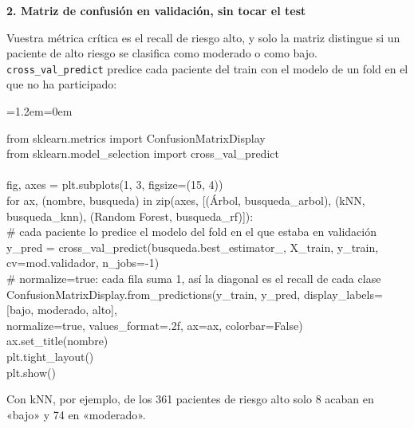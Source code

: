\documentclass[11pt,a4paper]{article}
\newenvironment{codigo}
  {\par\smallskip\begin{list}{}{\leftmargin=1.2em\rightmargin=0em}\item\relax\ttfamily\scriptsize\raggedright}
  {\end{list}\smallskip}
\begin{document}
{\smallskip\noindent\textbf{2. Matriz de confusión en validación, sin tocar el test}\par
Vuestra métrica crítica es el recall de riesgo alto, y solo la matriz distingue si un paciente de alto riesgo se clasifica como moderado o como bajo. \texttt{cross\_\allowbreak{}val\_\allowbreak{}predict} predice cada paciente del train con el modelo de un fold en el que no ha participado:

\begin{codigo}
from sklearn.metrics import ConfusionMatrixDisplay \\{}
from sklearn.model\_\allowbreak{}selection import cross\_\allowbreak{}val\_\allowbreak{}predict \\{}
\mbox{} \\{}
fig, axes = plt.subplots(1, 3, figsize=(15, 4)) \\{}
for ax, (nombre, busqueda) in zip(axes, [(\textquotedbl{}Árbol\textquotedbl{}, busqueda\_\allowbreak{}arbol), (\textquotedbl{}kNN\textquotedbl{}, busqueda\_\allowbreak{}knn), (\textquotedbl{}Random Forest\textquotedbl{}, busqueda\_\allowbreak{}rf)]): \\{}
\hspace*{2.08em}\# cada paciente lo predice el modelo del fold en el que estaba en validación \\{}
\hspace*{2.08em}y\_\allowbreak{}pred = cross\_\allowbreak{}val\_\allowbreak{}predict(busqueda.best\_\allowbreak{}estimator\_\allowbreak{}, X\_\allowbreak{}train, y\_\allowbreak{}train, cv=mod.validador, n\_\allowbreak{}jobs=-1) \\{}
\hspace*{2.08em}\# normalize=\textquotedbl{}true\textquotedbl{}: cada fila suma 1, así la diagonal es el recall de cada clase \\{}
\hspace*{2.08em}ConfusionMatrixDisplay.from\_\allowbreak{}predictions(y\_\allowbreak{}train, y\_\allowbreak{}pred, display\_\allowbreak{}labels=[\textquotedbl{}bajo\textquotedbl{}, \textquotedbl{}moderado\textquotedbl{}, \textquotedbl{}alto\textquotedbl{}], \\{}
\hspace*{22.88em}normalize=\textquotedbl{}true\textquotedbl{}, values\_\allowbreak{}format=\textquotedbl{}.2f\textquotedbl{}, ax=ax, colorbar=False) \\{}
\hspace*{2.08em}ax.set\_\allowbreak{}title(nombre) \\{}
plt.tight\_\allowbreak{}layout() \\{}
plt.show()
\end{codigo}
Con kNN, por ejemplo, de los 361 pacientes de riesgo alto solo 8 acaban en «bajo» y 74 en «moderado».

}
\end{document}
